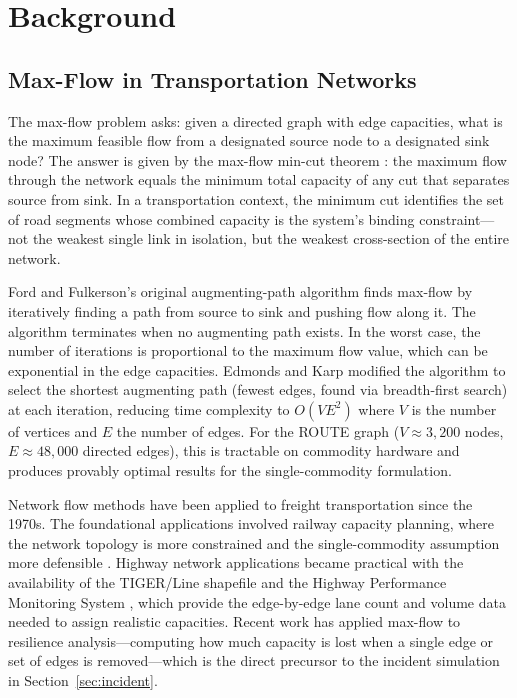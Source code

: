 \section{Background}
\label{sec:background}

\subsection{Max-Flow in Transportation Networks}

The max-flow problem asks: given a directed graph with edge capacities, what is the maximum feasible flow from a designated source node to a designated sink node? The answer is given by the max-flow min-cut theorem \citep{FordFulkerson1956}: the maximum flow through the network equals the minimum total capacity of any cut that separates source from sink. In a transportation context, the minimum cut identifies the set of road segments whose combined capacity is the system's binding constraint---not the weakest single link in isolation, but the weakest cross-section of the entire network.

Ford and Fulkerson's original augmenting-path algorithm \citep{FordFulkerson1956} finds max-flow by iteratively finding a path from source to sink and pushing flow along it. The algorithm terminates when no augmenting path exists. In the worst case, the number of iterations is proportional to the maximum flow value, which can be exponential in the edge capacities. Edmonds and Karp \citep{ROUTE_A1} modified the algorithm to select the shortest augmenting path (fewest edges, found via breadth-first search) at each iteration, reducing time complexity to $O(VE^2)$ where $V$ is the number of vertices and $E$ the number of edges. For the ROUTE graph ($V \approx 3{,}200$ nodes, $E \approx 48{,}000$ directed edges), this is tractable on commodity hardware and produces provably optimal results for the single-commodity formulation.

Network flow methods have been applied to freight transportation since the 1970s. The foundational applications involved railway capacity planning, where the network topology is more constrained and the single-commodity assumption more defensible \citep{ROUTE_A2}. Highway network applications became practical with the availability of the TIGER/Line shapefile \citep{TIGER2023} and the Highway Performance Monitoring System \citep{HPMS2018}, which provide the edge-by-edge lane count and volume data needed to assign realistic capacities. Recent work has applied max-flow to resilience analysis---computing how much capacity is lost when a single edge or set of edges is removed---which is the direct precursor to the incident simulation in Section~\ref{sec:incident}.

